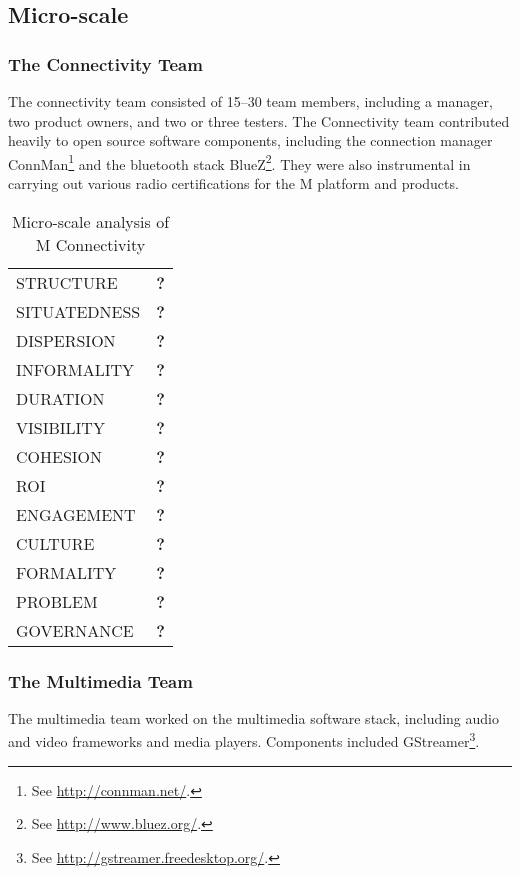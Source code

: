 \documentclass[
a4paper,
11pt,
parskip,
\MYLANGUAGE,
abstractoff,
bibliography=totoc
]{scrartcl}
\begin{document}
\subsection{Micro-scale}

\subsubsection{The Connectivity Team}

The connectivity team consisted of 15--30 team members, including a manager, two product owners, and two or three testers. The Connectivity team contributed heavily to open source software components, including the connection manager ConnMan\footnote{See \url{http://connman.net/}.} and the bluetooth stack BlueZ\footnote{See \url{http://www.bluez.org/}.}. They were also instrumental in carrying out various radio certifications for the M platform and products.

\begin{table}[htbp]
\begin{center}
\begin{tabular}{lp{100mm}}
STRUCTURE & {\bf ?} \\
SITUATEDNESS & {\bf ?} \\
DISPERSION & {\bf ?} \\
INFORMALITY & {\bf ?} \\
DURATION & {\bf ?} \\
VISIBILITY & {\bf ?} \\
COHESION & {\bf ?} \\
ROI & {\bf ?} \\
ENGAGEMENT & {\bf ?} \\
CULTURE & {\bf ?} \\
FORMALITY & {\bf ?} \\
PROBLEM & {\bf ?} \\
GOVERNANCE & {\bf ?} \\
\end{tabular}
\vspace{1em}
\caption{Micro-scale analysis of M Connectivity}
\label{tab:microconn}
\end{center}
\end{table}

\subsubsection{The Multimedia Team}

The multimedia team worked on the multimedia software stack, including audio and video frameworks and media players. Components included GStreamer\footnote{See \url{http://gstreamer.freedesktop.org/}.}.
\end{document}
